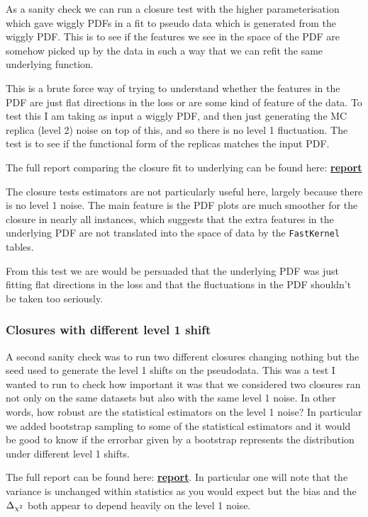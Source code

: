 As a sanity check we can run a closure test with the higher parameterisation
which gave wiggly PDFs in a fit to pseudo data which is generated from the
wiggly PDF. This is to see if the features we see in the space of the PDF are
somehow picked up by the data in such a way that we can refit the same underlying
function.

This is a brute force way of trying to understand whether the features in the PDF
are just flat directions in the loss or are some kind of feature of the data. To
test this I am taking as input a wiggly PDF, and then just generating the MC
replica (level 2) noise on top of this, and so there is no level 1 fluctuation.
The test is to see if the functional form of the replicas matches the input PDF.

The full report comparing the closure fit to underlying can be found here:
\href{https://vp.nnpdf.science/tHdjyBVTQEOlfkNjUXPMFQ==}{\bf{report}}

The closure tests estimators are not particularly useful here, largely because
there is no level 1 noise. The main feature is the PDF plots are much smoother
for the closure in nearly all instances, which suggests that the extra features
in the underlying PDF are not translated into the space of data by the
\texttt{FastKernel} tables.

From this test we are would be persuaded that the underlying PDF was just fitting
flat directions in the loss and that the fluctuations in the PDF shouldn't be
taken too seriously.

\subsubsection*{Closures with different level 1 shift}

A second sanity check was to run two different closures changing nothing but the
seed used to generate the level 1 shifts on the pseudodata. This was a test I
wanted to run to check how important it was that we considered two closures ran
not only on the same datasets but also with the same level 1 noise. In other
words, how robust are the statistical estimators on the level 1 noise? In particular
we added bootstrap sampling to some of the statistical estimators and it would
be good to know if the errorbar given by a bootstrap represents the distribution
under different level 1 shifts.

The full report can be found here:
\href{https://vp.nnpdf.science/mbcTUd6-TQmQFvaGd37bkg==}{\bf{report}}. In particular
one will note that the variance is unchanged within statistics as you would expect
but the bias and the $\Delta_{\chi^{2}}$ both appear to depend heavily on the level 1 noise.

